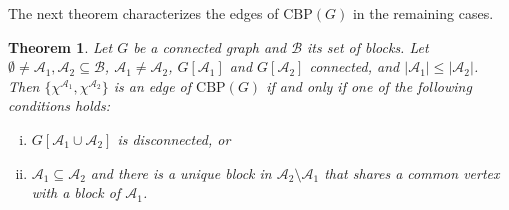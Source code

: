 \documentclass[12pt]{amsart}
\newtheorem{theorem}{Theorem}[section]
\newcommand{\CBP}{\mathrm{CBP}}
\newcommand{\B}{\mathcal{B}}
\newcommand{\A}{\mathcal{A}}
\begin{document}
The next theorem characterizes the edges of $\CBP(G)$ in the remaining cases.

\begin{theorem}
\label{edges}
    Let $G$ be a connected graph and $\B$ its set of blocks. Let $\emptyset \neq \A_1,\A_2 \subseteq \B$, $\A_1 \neq \A_2$, $G[\A_1]$ and $G[\A_2]$ connected, and $\vert \A_1 \vert \le \vert \A_2 \vert$. Then $\{\chi^{\A_1},\chi^{\A_2}\}$ is an edge of $\CBP(G)$ if and only if one of the following conditions holds:
\begin{enumerate}[(i)]
    \item $G[\A_1 \cup \A_2]$ is disconnected, or
    \item $\A_1 \subseteq \A_2$ and there is a unique block in $\A_2 \setminus \A_1$ that shares a common vertex with a block of $\A_1$.
\end{enumerate}
\end{theorem}
\end{document}
